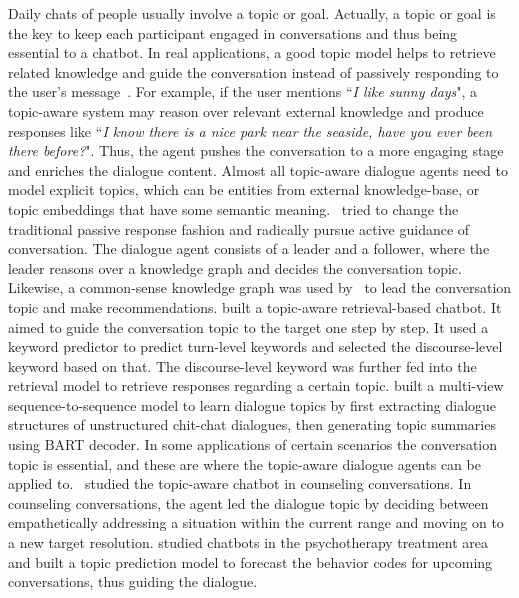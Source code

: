 \label{Conversation Topic}
Daily chats of people usually involve a topic or goal. Actually, a topic or goal is the key to keep each participant engaged in conversations and thus being essential to a chatbot. In real applications, a good topic model helps to retrieve related knowledge and guide the conversation instead of passively responding to the user's message~. For example, if the user mentions ``\textit{I like sunny days}", a topic-aware system may reason over relevant external knowledge and produce responses like ``\textit{I know there is a nice park near the seaside, have you ever been there before?}". Thus, the agent pushes the conversation to a more engaging stage and enriches the dialogue content. 
Almost all topic-aware dialogue agents need to model explicit topics, which can be entities from external knowledge-base, or topic embeddings that have some semantic meaning.~ tried to change the traditional passive response fashion and radically pursue active guidance of conversation. The dialogue agent consists of a leader and a follower, where the leader reasons over a knowledge graph and decides the conversation topic. Likewise, a common-sense knowledge graph was used by~ to lead the conversation topic and make recommendations.  built a topic-aware retrieval-based chatbot. It aimed to guide the conversation topic to the target one step by step. It used a keyword predictor to predict turn-level keywords and selected the discourse-level keyword based on that. The discourse-level keyword was further fed into the retrieval model to retrieve responses regarding a certain topic.  built a multi-view sequence-to-sequence model to learn dialogue topics by first extracting dialogue structures of unstructured chit-chat dialogues, then generating topic summaries using BART decoder. 
In some applications of certain scenarios the conversation topic is essential, and these are where the topic-aware dialogue agents can be applied to.~ studied the topic-aware chatbot in counseling conversations. In counseling conversations, the agent led the dialogue topic by deciding between empathetically addressing a situation within the current range and moving on to a new target resolution.  studied chatbots in the psychotherapy treatment area and built a topic prediction model to forecast the behavior codes for upcoming conversations, thus guiding the dialogue.

